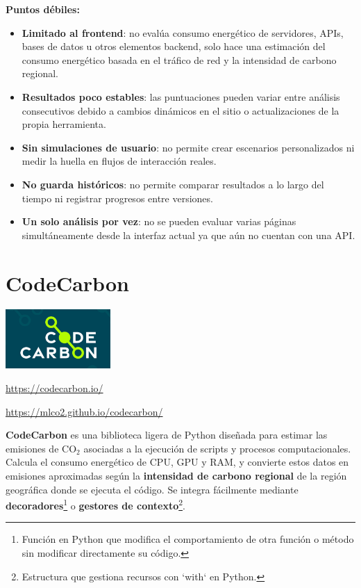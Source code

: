 \documentclass[12pt,a4paper]{report}
\begin{document}
\textbf{Puntos débiles:}
\begin{itemize}
  \item \textbf{Limitado al frontend}: no evalúa consumo energético de servidores, APIs, bases de datos u otros elementos backend, solo hace una estimación del consumo energético basada en el tráfico de red y la intensidad de carbono regional.
  \item \textbf{Resultados poco estables}: las puntuaciones pueden variar entre análisis consecutivos debido a cambios dinámicos en el sitio o actualizaciones de la propia herramienta.
  \item \textbf{Sin simulaciones de usuario}: no permite crear escenarios personalizados ni medir la huella en flujos de interacción reales.
  \item \textbf{No guarda históricos}: no permite comparar resultados a lo largo del tiempo ni registrar progresos entre versiones.
  \item \textbf{Un solo análisis por vez}: no se pueden evaluar varias páginas simultáneamente desde la interfaz actual ya que aún no cuentan con una API.
\end{itemize}

\section*{\textbf{CodeCarbon}}

\begin{center}
\includegraphics[width=0.3\textwidth]{imagenes/CodeCarbon_Logo.jpg}
\end{center}

\url{https://codecarbon.io/}

\url{https://mlco2.github.io/codecarbon/}

\textbf{CodeCarbon} es una biblioteca ligera de Python diseñada para estimar las emisiones de CO$_2$ asociadas a la ejecución de scripts y procesos computacionales. Calcula el consumo energético de CPU, GPU y RAM, y convierte estos datos en emisiones aproximadas según la \textbf{intensidad de carbono regional} de la región geográfica donde se ejecuta el código. Se integra fácilmente mediante \textbf{decoradores}\footnote{Función en Python que modifica el comportamiento de otra función o método sin modificar directamente su código.} o \textbf{gestores de contexto}\footnote{Estructura que gestiona recursos con `with` en Python.}.
\end{document}

